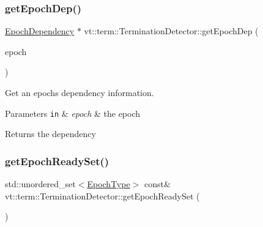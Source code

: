 \subsubsection{\texorpdfstring{get\+Epoch\+Dep()}{getEpochDep()}}
{\footnotesize\ttfamily \hyperlink{structvt_1_1term_1_1_epoch_dependency}{Epoch\+Dependency} $\ast$ vt\+::term\+::\+Termination\+Detector\+::get\+Epoch\+Dep (\begin{DoxyParamCaption}\item[{\hyperlink{namespacevt_a81d11b28122d43bf9834577e4a06440f}{Epoch\+Type}}]{epoch }\end{DoxyParamCaption})\hspace{0.3cm}{\ttfamily [private]}}



Get an epoch\textquotesingle{}s dependency information. 


\begin{DoxyParams}[1]{Parameters}
\mbox{\tt in}  & {\em epoch} & the epoch\\
\hline
\end{DoxyParams}
\begin{DoxyReturn}{Returns}
the dependency 
\end{DoxyReturn}
\mbox{\label{structvt_1_1term_1_1_termination_detector_a8eb6730fc343957d0a788919b641762e}} 
\subsubsection{\texorpdfstring{get\+Epoch\+Ready\+Set()}{getEpochReadySet()}}
{\footnotesize\ttfamily std\+::unordered\+\_\+set$<$\hyperlink{namespacevt_a81d11b28122d43bf9834577e4a06440f}{Epoch\+Type}$>$ const\& vt\+::term\+::\+Termination\+Detector\+::get\+Epoch\+Ready\+Set (\begin{DoxyParamCaption}{ }\end{DoxyParamCaption})\hspace{0.3cm}{\ttfamily [inline]}}

\mbox{\label{structvt_1_1term_1_1_termination_detector_a185004af9f842c58258128456ef27160}} 
